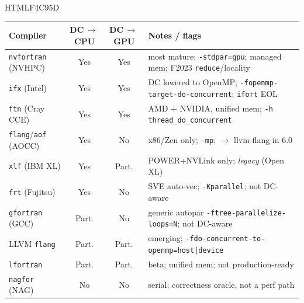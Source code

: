 \definecolor{cWip} {HTML}{F4C95D}
\newcommand{\yes}[1]{\cellcolor{cDone}#1}
\newcommand{\prt}[1]{\cellcolor{cWip}#1}
\newcommand{\nope}[1]{\cellcolor{cTodo}#1}

{\footnotesize
\setlength{\tabcolsep}{4pt}
\renewcommand{\arraystretch}{1.25}
\begin{tabularx}{\textwidth}{@{}l c c >{\raggedright\arraybackslash}X@{}}
\toprule
\textbf{Compiler} & \textbf{DC\,$\to$\,CPU} & \textbf{DC\,$\to$\,GPU} & \textbf{Notes / flags} \\
\midrule
\texttt{nvfortran} (NVHPC)         & \yes{Yes}   & \yes{Yes}   & most mature; \texttt{-stdpar=gpu}; managed mem; F2023 \texttt{reduce}/locality \\
\texttt{ifx} (Intel)               & \yes{Yes}   & \yes{Yes}   & DC lowered to OpenMP; \texttt{-fopenmp-target-do-concurrent}; \texttt{ifort} EOL \\
\texttt{ftn} (Cray CCE)            & \yes{Yes}   & \yes{Yes}   & AMD + NVIDIA, unified mem; \texttt{-h thread\_do\_concurrent} \\
\texttt{flang}/\texttt{aof} (AOCC) & \yes{Yes}   & \nope{No}   & x86/Zen only; \texttt{-mp}; $\to$ llvm-flang in 6.0 \\
\texttt{xlf} (IBM XL)              & \yes{Yes}   & \prt{Part.} & POWER+NVLink only; \emph{legacy} (Open XL) \\
\texttt{frt} (Fujitsu)             & \yes{Yes}   & \nope{No}   & SVE auto-vec; \texttt{-Kparallel}; not DC-aware \\
\texttt{gfortran} (GCC)            & \prt{Part.} & \nope{No}   & generic autopar \texttt{-ftree-parallelize-loops=N}; not DC-aware \\
LLVM \texttt{flang}                & \prt{Part.} & \prt{Part.} & emerging; \texttt{-fdo-concurrent-to-openmp=host|device} \\
\texttt{lfortran}                  & \prt{Part.} & \prt{Part.} & beta; unified mem; not production-ready \\
\texttt{nagfor} (NAG)              & \nope{No}   & \nope{No}   & serial; correctness oracle, not a perf path \\
\bottomrule
\end{tabularx}}
